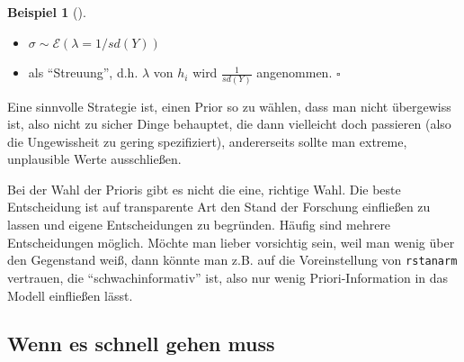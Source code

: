 \documentclass[
  ngerman,
  letterpaper,
  twoside,
  open=any]{scrbook}
\providecommand{\tightlist}{%
  \setlength{\itemsep}{0pt}\setlength{\parskip}{0pt}}\usepackage{longtable,booktabs,array}
\theoremstyle{definition}
\newtheorem{example}{Beispiel}[chapter]
\theoremstyle{plain}
\theoremstyle{definition}
\theoremstyle{definition}
\theoremstyle{remark}
\begin{document}
\begin{example}[]
\begin{tcolorbox}
\begin{itemize}
  \begin{itemize}
  \tightlist
  \item
    \(\sigma \sim \mathcal{E}(\lambda=1/sd(Y))\)
  \item
    als \enquote{Streuung}, d.h. \(\lambda\) von \(h_i\) wird
    \(\frac{1}{sd(Y)}\) angenommen. \(\square\)
  \end{itemize}
\end{itemize}

\end{tcolorbox}

Eine sinnvolle Strategie ist, einen Prior so zu wählen, dass man nicht
übergewiss ist, also nicht zu sicher Dinge behauptet, die dann
vielleicht doch passieren (also die Ungewissheit zu gering
spezifiziert), andererseits sollte man extreme, unplausible Werte
ausschließen.

\begin{tcolorbox}[enhanced jigsaw, arc=.35mm, bottomrule=.15mm, bottomtitle=1mm, breakable, colback=white, colbacktitle=quarto-callout-important-color!10!white, colframe=quarto-callout-important-color-frame, coltitle=black, left=2mm, leftrule=.75mm, opacityback=0, opacitybacktitle=0.6, rightrule=.15mm, title=\textcolor{quarto-callout-important-color}{\faExclamation}\hspace{0.5em}{Wichtig}, titlerule=0mm, toprule=.15mm, toptitle=1mm]

Bei der Wahl der Prioris gibt es nicht die eine, richtige Wahl. Die
beste Entscheidung ist auf transparente Art den Stand der Forschung
einfließen zu lassen und eigene Entscheidungen zu begründen. Häufig sind
mehrere Entscheidungen möglich. Möchte man lieber vorsichtig sein, weil
man wenig über den Gegenstand weiß, dann könnte man z.B. auf die
Voreinstellung von \texttt{rstanarm} vertrauen, die
\enquote{schwachinformativ} ist, also nur wenig Priori-Information in
das Modell einfließen lässt.

\end{tcolorbox}

\subsection{Wenn es schnell gehen
muss}\label{wenn-es-schnell-gehen-muss}


\end{example}
\end{document}
